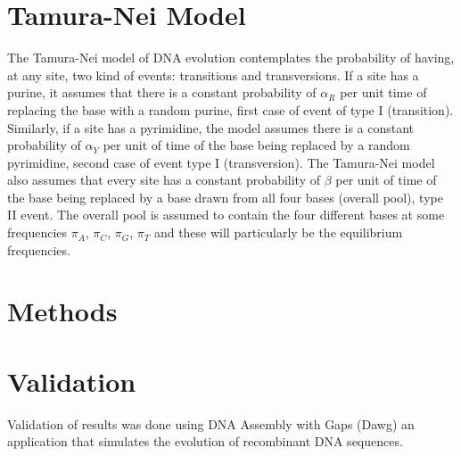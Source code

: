 \documentclass[12pt,twoside]{article}
\begin{document}
\section{Tamura-Nei Model}
The Tamura-Nei model of DNA evolution contemplates the probability of having, at any site, two kind of events: transitions and transversions. If a site has a purine, it assumes that there is a constant probability of $\alpha_{R}$ per unit time of replacing the base with a random purine, first case of event of type I (transition). Similarly, if a site has a pyrimidine, the model assumes there is a constant probability of $\alpha_{Y}$ per unit of time of the base being replaced by a random pyrimidine, second case of event type I (transversion). The Tamura-Nei model also assumes that every site has a constant probability of $\beta$ per unit of time of the base being replaced by a base drawn from all four bases (overall pool), type II event. The overall pool is assumed to contain the four different bases at some frequencies $\pi_{A}$, $\pi_{C}$, $\pi_{G}$, $\pi_{T}$ and these will particularly be the equilibrium frequencies.

\section{Methods}

\section{Validation}
Validation of results was done using DNA Assembly with Gaps (Dawg) \cite{dawg} an application that simulates the evolution of recombinant DNA sequences.




\end{document}
